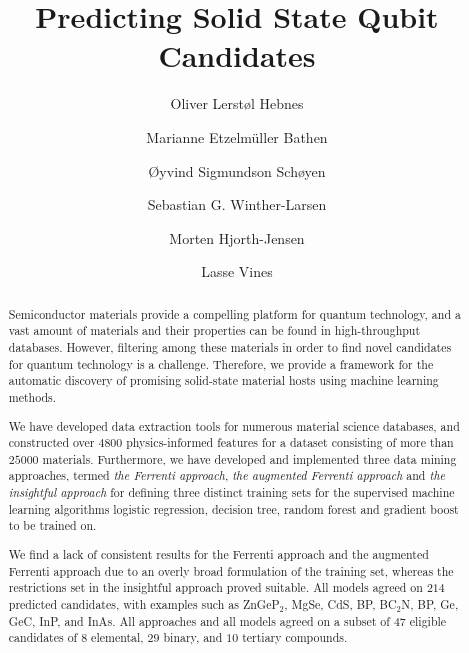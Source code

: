 \documentclass[superscriptaddress,unsortedaddress,
 amsmath,amssymb,
 aps,
]{revtex4-2}
\begin{document}
\title{Predicting Solid State Qubit Candidates}

\author{Oliver Lerstøl Hebnes}
\author{Marianne Etzelm\"uller Bathen}
\author{Øyvind Sigmundson Schøyen}
\author{Sebastian G. Winther-Larsen}
\author{Morten Hjorth-Jensen}
\author{Lasse Vines}

\begin{abstract}

Semiconductor materials provide a compelling platform for quantum
technology, and a vast amount of materials and their properties can be
found in high-throughput databases.  However, filtering among these
materials in order to find novel candidates for quantum technology is
a challenge. Therefore, we provide a framework for the automatic
discovery of promising solid-state material hosts using machine
learning methods.

We have developed data extraction tools for numerous material science
databases, and constructed over $4800$ physics-informed features for a
dataset consisting of more than $25000$ materials.  Furthermore, we
have developed and implemented three data mining approaches, termed
\textit{the Ferrenti approach}, \textit{the augmented Ferrenti
  approach} and \textit{the insightful approach} for defining three
distinct training sets for the supervised machine learning algorithms
logistic regression, decision tree, random forest and gradient boost
to be trained on.

We find a lack of consistent results for the Ferrenti approach and the
augmented Ferrenti approach due to an overly broad formulation of the
training set, whereas the restrictions set in the insightful approach
proved suitable. All models agreed on $214$ predicted candidates, with
examples such as ZnGeP$_2$, MgSe, CdS, BP, BC$_2$N, BP, Ge, GeC, InP,
and InAs. All approaches and all models agreed on a subset of $47$
eligible candidates of $8$ elemental, $29$ binary, and $10$ tertiary
compounds.

\end{abstract}
\end{document}
